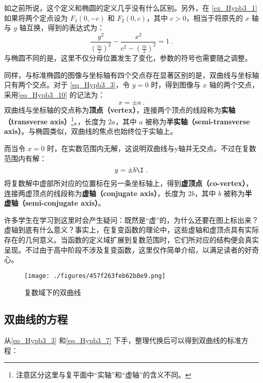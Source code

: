 如之前所说，这个定义和椭圆的定义几乎没有什么区别。另外，在 \autoref{ex_Hypb3_1} 如果将两个定点设为 $F_1(0,-c)$ 和 $F_2(0,c)$，其中 $c>0$，相当于将原先的 $x$ 轴与 $y$ 轴互换，得到的表达式为：
\begin{equation}\label{eq_Hypb3_7}
\frac{y^2}{\left(\displaystyle\frac{m}{2}\right)^2}-\frac{x^2}{\displaystyle c^2-\left(\frac{m}{2}\right)^2} =1~.
\end{equation}
与椭圆不同的是，这里不仅分母位置发生了变化，参数的符号也需要随之调整。

同样，与标准椭圆的图像与坐标轴有四个交点存在显著区别的是，双曲线与坐标轴只有两个交点。对于 \autoref{eq_Hypb3_3}，令 $y=0$ 时，得到图像与 $x$ 轴的两个交点，采用\autoref{eq_Hypb3_10} 的记法为：
\begin{equation}
x = \pm a~.
\end{equation}
双曲线与坐标轴的交点称为\textbf{顶点（vertex）}，连接两个顶点的线段称为\textbf{实轴（transverse axis）}\footnote{注意区分这里与复平面中“实轴”和“虚轴”的含义不同。}。，长度为 $2a$，其中 $a$ 被称为\textbf{半实轴（semi-transverse axis）}。与椭圆类似，双曲线的焦点也始终位于实轴上。

而当令 $x=0$ 时，在实数范围内无解，这说明双曲线与y轴并无交点。不过在复数范围内有解：
\begin{equation}
y = \pm  b\I~.
\end{equation}
将复数解中虚部所对应的位置标在另一条坐标轴上，得到\textbf{虚顶点（co-vertex）}，连接两虚顶点的线段称为\textbf{虚轴（conjugate axis）}，长度为 $2b$，其中 $b$ 被称为\textbf{半虚轴（semi-conjugate axis）}。

许多学生在学习到这里时会产生疑问：既然是“虚”的，为什么还要在图上标出来？虚轴到底有什么意义？事实上，在复变函数的理论中，这些虚轴和虚顶点具有实际存在的几何意义。当函数的定义域扩展到复数范围时，它们所对应的结构便会真实呈现。不过由于高中阶段不涉及复变函数，这里仅作简单介绍，以满足读者的好奇心。

\begin{figure}[ht]
\centering
\texttt{[image: ./figures/457f263feb62b8e9.png]}
\caption{复数域下的双曲线} \label{fig_Hypb3_2}
\end{figure}

\subsection{双曲线的方程}

从\autoref{eq_Hypb3_3} 和\autoref{eq_Hypb3_7} 下手，整理代换后可以得到双曲线的标准方程：

